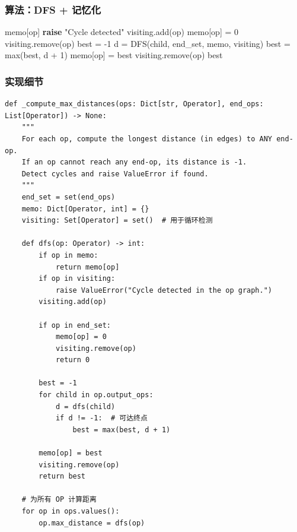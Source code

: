 \documentclass[12pt,a4paper]{article}
\begin{document}
\subsubsection{算法：DFS + 记忆化}

\begin{algorithm}
\caption{计算最长距离到终点}
\begin{algorithmic}[1]
        \State \Return memo[op]
    \EndIf
        \State \textbf{raise} "Cycle detected"
    \EndIf
    \State visiting.add(op)
        \State memo[op] = 0
        \State visiting.remove(op)
        \State {}
    \EndIf
    \State best = -1
        \State d = DFS(child, end\_set, memo, visiting)
            \State best = max(best, d + 1)
        \EndIf
    \EndFor
    \State memo[op] = best
    \State visiting.remove(op)
    \State \Return best
\EndProcedure
\end{algorithmic}
\end{algorithm}

\subsubsection{实现细节}

\begin{lstlisting}
def _compute_max_distances(ops: Dict[str, Operator], end_ops: List[Operator]) -> None:
    """
    For each op, compute the longest distance (in edges) to ANY end-op.
    If an op cannot reach any end-op, its distance is -1.
    Detect cycles and raise ValueError if found.
    """
    end_set = set(end_ops)
    memo: Dict[Operator, int] = {}
    visiting: Set[Operator] = set()  # 用于循环检测
    
    def dfs(op: Operator) -> int:
        if op in memo:
            return memo[op]
        if op in visiting:
            raise ValueError("Cycle detected in the op graph.")
        visiting.add(op)
        
        if op in end_set:
            memo[op] = 0
            visiting.remove(op)
            return 0
        
        best = -1
        for child in op.output_ops:
            d = dfs(child)
            if d != -1:  # 可达终点
                best = max(best, d + 1)
        
        memo[op] = best
        visiting.remove(op)
        return best
    
    # 为所有 OP 计算距离
    for op in ops.values():
        op.max_distance = dfs(op)
\end{lstlisting}
\end{document}
